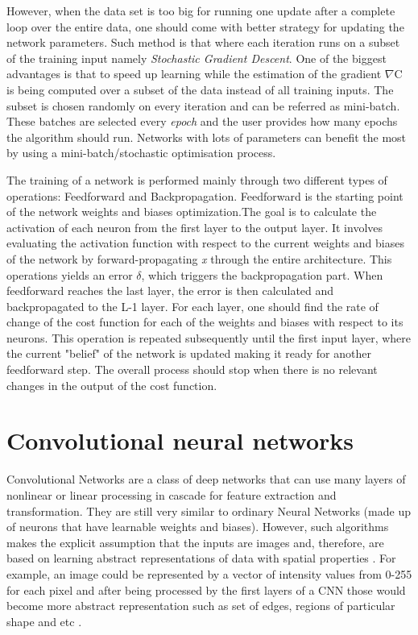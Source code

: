 However, when the data set is too big for running one update after a complete loop over the entire data, one should come with better strategy for updating the network parameters. Such method is that where each iteration runs on a subset of the training input namely \textit{Stochastic Gradient Descent}. One of the biggest advantages is that to speed up learning while the estimation of the gradient $\nabla$C is being computed over a subset of the data instead of all training inputs. The subset is chosen randomly on every iteration and can be referred as mini-batch. These batches are selected every \textit{epoch} and the user provides how many epochs the algorithm should run. Networks with lots of parameters can benefit the most by using a mini-batch/stochastic optimisation process.


The training of a network is performed mainly through two different types of operations: Feedforward and Backpropagation. Feedforward is the starting point of the network weights and biases optimization.The goal is to calculate the activation of each neuron from the first layer to the output layer. It involves evaluating the activation function with respect to the current weights and biases of the network by forward-propagating \textit{x} through the entire architecture. This operations yields an error $\delta$, which triggers the backpropagation part. When feedforward reaches the last layer, the error is then calculated and backpropagated to the L-1 layer. For each layer, one should find the rate of change of the cost function for each of the weights and biases with respect to its neurons. This operation is repeated subsequently until the first input layer, where the current "belief" of the network is updated making it ready for another feedforward step. The overall process should stop when there is no relevant changes in the output of the cost function.


\section{Convolutional neural networks}

Convolutional Networks are a class of deep networks that can use many layers of nonlinear or linear processing in cascade for feature extraction and transformation. They are still very similar to ordinary Neural Networks (made up of neurons that have learnable weights and biases). However, such algorithms makes the explicit assumption that the inputs are images and, therefore, are based on learning abstract representations of data with spatial properties \cite{goodfellow2016_book}. For example, an image could be represented by a vector of intensity values from 0-255 for each pixel and after being processed by the first layers of a CNN those would become more abstract representation such as set of edges, regions of particular shape and etc \cite{stanford2016}.

